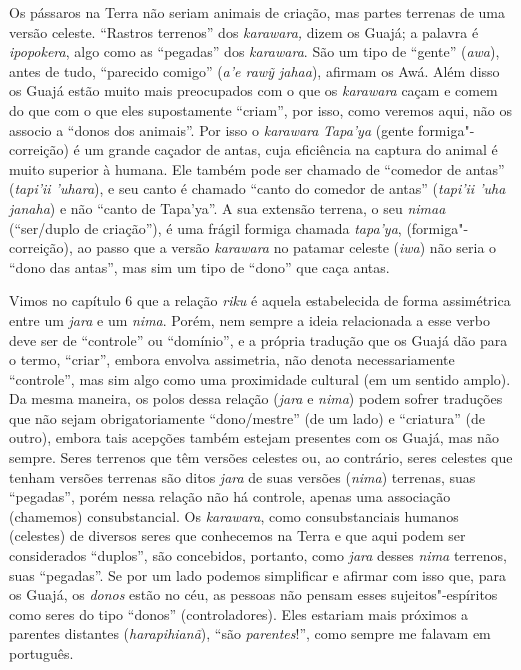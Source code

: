 Os pássaros na Terra não seriam animais de criação, mas partes terrenas
de uma versão celeste. ``Rastros terrenos'' dos \emph{karawara,} dizem os
Guajá; a palavra é \emph{ipopokera}, algo como as ``pegadas'' dos
\emph{karawara}. São um tipo de ``gente'' (\emph{awa}), antes de tudo,
``parecido comigo'' (\emph{a'e rawỹ jahaa}), afirmam os Awá. Além disso os
Guajá estão muito mais preocupados com o que os \emph{karawara} caçam e
comem do que com o que eles supostamente ``criam'', por isso, como
veremos aqui, não os associo a ``donos dos animais''. Por isso o
\emph{karawara} \emph{Tapa'ya} (gente formiga"-correição) é um grande
caçador de antas, cuja eficiência na captura do animal é muito superior
à humana. Ele também pode ser chamado de ``comedor de antas''
(\emph{tapi'ii 'uhara}), e seu canto é chamado ``canto do comedor de
antas'' (\emph{tapi'ii 'uha janaha}) e não ``canto de Tapa'ya''. A sua
extensão terrena, o seu \emph{nimaa} (``ser/duplo de criação''), é uma
frágil formiga chamada \emph{tapa'ya}, (formiga"-correição), ao passo que
a versão \emph{karawara} no patamar celeste (\emph{iwa}) não seria o
``dono das antas'', mas sim um tipo de ``dono'' que caça antas.

Vimos no capítulo 6 que a relação \emph{riku} é aquela estabelecida de
forma assimétrica entre um \emph{jara} e um \emph{nima}. Porém, nem
sempre a ideia relacionada a esse verbo deve ser de ``controle'' ou
``domínio'', e a própria tradução que os Guajá dão para o termo, ``criar'',
embora envolva assimetria, não denota necessariamente ``controle'', mas
sim algo como uma proximidade cultural (em um sentido amplo). Da mesma
maneira, os polos dessa relação (\emph{jara} e \emph{nima}) podem sofrer
traduções que não sejam obrigatoriamente ``dono/mestre'' (de um lado) e
``criatura'' (de outro), embora tais acepções também estejam presentes com
os Guajá, mas não sempre. Seres terrenos que têm versões celestes ou, ao
contrário, seres celestes que tenham versões terrenas são ditos
\emph{jara} de suas versões (\emph{nima}) terrenas, suas ``pegadas'',
porém nessa relação não há controle, apenas uma associação (chamemos)
consubstancial. Os \emph{karawara}, como consubstanciais humanos
(celestes) de diversos seres que conhecemos na Terra e que aqui podem
ser considerados ``duplos'', são concebidos, portanto, como \emph{jara}
desses \emph{nima} terrenos, suas ``pegadas''. Se por um lado podemos
simplificar e afirmar com isso que, para os Guajá, os \emph{donos} estão
no céu, as pessoas não pensam esses sujeitos"-espíritos como seres do
tipo ``donos'' (controladores). Eles estariam mais próximos a parentes
distantes (\emph{harapihianã}), ``são \emph{parentes}!'', como sempre me
falavam em português.

